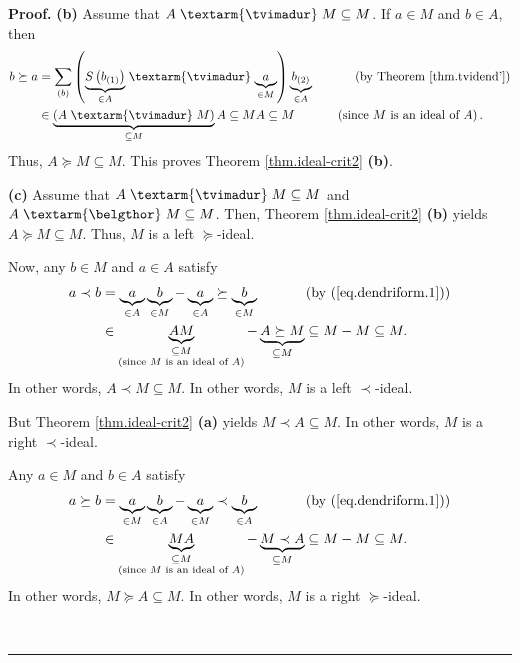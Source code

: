 \documentclass[numbers=enddot,12pt,final,onecolumn,notitlepage]{scrartcl}%
\theoremstyle{definition}
\newenvironment{proof}[1][Proof]{\noindent\textbf{#1.} }{\ \rule{0.5em}{0.5em}}
\newenvironment{verlong}{}{}
\newcommand{\tvi}{\left. \textarm{\tvimadur} \right.}
\newcommand{\bel}{\left. \textarm{\belgthor} \right.}
\let\sumnonlimits\sum
\renewcommand{\sum}{\sumnonlimits\limits}
\begin{document}
\begin{verlong}
\begin{proof}
\textbf{(b)} Assume that $A\tvi  M\subseteq M$. If $a\in M$ and $b\in A$, then%
\begin{align*}
b\left.  \succeq\right.  a  &  =\sum_{\left(  b\right)  }\left(
\underbrace{S\left(  b_{\left(  1\right)  }\right)  }_{\in A}%
\tvi \underbrace{a}_{\in M}\right)  \underbrace{b_{\left(  2\right)  }}_{\in
A}\ \ \ \ \ \ \ \ \ \ \left(  \text{by Theorem \ref{thm.tvidend'}}\right) \\
&  \in\underbrace{\left(  A\tvi M\right)  }_{\subseteq M}A\subseteq
MA\subseteq M\ \ \ \ \ \ \ \ \ \ \left(  \text{since }M\text{ is an ideal of
}A\right)  .
\end{align*}
Thus, $A\left.  \succeq\right.  M\subseteq M$. This proves Theorem
\ref{thm.ideal-crit2} \textbf{(b)}.

\textbf{(c)} Assume that $A\tvi  M\subseteq M$ and $A\bel  M\subseteq M$.
Then, Theorem \ref{thm.ideal-crit2} \textbf{(b)} yields $A\left.
\succeq\right.  M\subseteq M$. Thus, $M$ is a left $\left.  \succeq\right.  $-ideal.

Now, any $b\in M$ and $a\in A$ satisfy%
\begin{align*}
a\left.  \prec\right.  b  &  =\underbrace{a}_{\in A}\underbrace{b}_{\in
M}-\underbrace{a}_{\in A}\left.  \succeq\right.  \underbrace{b}_{\in
M}\ \ \ \ \ \ \ \ \ \ \left(  \text{by (\ref{eq.dendriform.1})}\right) \\
&  \in\underbrace{AM}_{\substack{\subseteq M\\\text{(since }M\text{ is an
ideal of }A\text{)}}}-\underbrace{A\left.  \succeq\right.  M}_{\subseteq
M}\subseteq M-M\subseteq M.
\end{align*}
In other words, $A\left.  \prec\right.  M\subseteq M$. In other words, $M$ is
a left $\left.  \prec\right.  $-ideal.

But Theorem \ref{thm.ideal-crit2} \textbf{(a)} yields $M\left.  \prec\right.
A\subseteq M$. In other words, $M$ is a right $\left.  \prec\right.  $-ideal.

Any $a\in M$ and $b\in A$ satisfy%
\begin{align*}
a\left.  \succeq\right.  b  &  =\underbrace{a}_{\in M}\underbrace{b}_{\in
A}-\underbrace{a}_{\in M}\left.  \prec\right.  \underbrace{b}_{\in
A}\ \ \ \ \ \ \ \ \ \ \left(  \text{by (\ref{eq.dendriform.1})}\right) \\
&  \in\underbrace{MA}_{\substack{\subseteq M\\\text{(since }M\text{ is an
ideal of }A\text{)}}}-\underbrace{M\left.  \prec\right.  A}_{\subseteq
M}\subseteq M-M\subseteq M.
\end{align*}
In other words, $M\left.  \succeq\right.  A\subseteq M$. In other words, $M$
is a right $\left.  \succeq\right.  $-ideal.


\end{proof}
\end{verlong}
\end{document}
